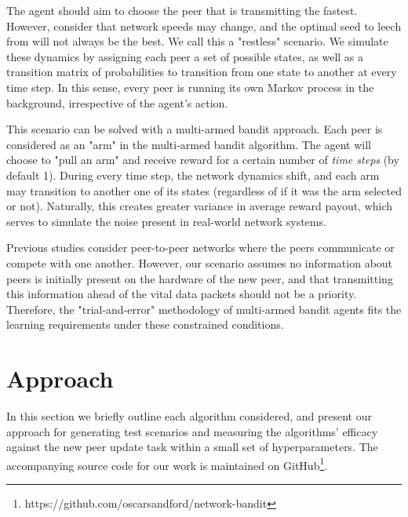 \documentclass{article}
\begin{document}
The agent should aim to choose the peer that is transmitting the fastest. However, consider that network speeds may change, and the optimal seed to leech from will 
not always be the best. We call this a "restless" scenario. We simulate these dynamics by assigning each peer a set of possible states, as well as a transition matrix 
of probabilities to transition from one state to another at every time step. In this sense, every peer is running its own Markov process in the background, irrespective 
of the agent's action.

This scenario can be solved with a multi-armed bandit approach. Each peer is considered as an "arm" in the multi-armed bandit algorithm. The agent will choose to 
"pull an arm" and receive reward for a certain number of \emph{time steps} (by default 1). During every time step, the network dynamics shift, and each arm may 
transition to another one of its states (regardless of if it was the arm selected or not). Naturally, this creates greater variance in average reward payout, which 
serves to simulate the noise present in real-world network systems. 

Previous studies \cite{multiuser_mab,gossip_based_distrivuted_stochastic,p2p_offloading_with_delayed_feedback} consider peer-to-peer networks where the peers communicate 
or compete with one another. However, our scenario assumes no information about peers is initially present on the hardware of the new peer, and that transmitting this 
information ahead of the vital data packets should not be a priority. Therefore, the "trial-and-error" methodology of multi-armed bandit agents fits the learning 
requirements under these constrained conditions.


\section{Approach}


In this section we briefly outline each algorithm considered, and present our approach for generating test scenarios and measuring the algorithms' efficacy against the 
new peer update task within a small set of hyperparameters. The accompanying source code for our work is maintained on 
GitHub\footnote{https://github.com/oscarsandford/network-bandit}.
\end{document}
